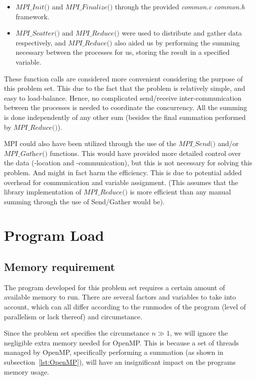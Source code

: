 \documentclass[fontsize=11pt,paper=a4,titlepage]{report}
\begin{document}
\begin{itemize}
	\item{$\textit{MPI\_Init()}$ and $\textit{
MPI\_Finalize()}$ through the provided \textit{common.c} \textit{common.h}
framework.}
	\item{$\textit{MPI\_Scatter()}$ and $\textit{MPI\_Reduce()}$ were used to
distribute 	and gather data respectively, and $\textit{MPI\_Reduce()}$ also
aided us by performing the summing necessary between the processes for us,
storing the result in a specified variable.}
\end{itemize}

These function calls are considered more convenient considering the purpose of
this problem set. This due to the fact that the problem is relatively simple,
and easy to load-balance. Hence, no complicated send/receive inter-communication
between the processes is needed to coordinate the concurrency. All the summing
is done independently of any other sum (besides the final summation performed by
$\textit{MPI\_Reduce()}$).

MPI could also have been utilized through the use of the $\textit{MPI\_Send()}$
and/or $\textit{MPI\_Gather()}$ functions. This would have provided more
detailed control over the data (-location and -communication), but this is not
necessary for solving this problem. And might in fact harm the efficiency. This
is due to potential added overhead for communication and variable assignment.
(This assumes that the library implementation of $\textit{MPI\_Reduce()}$ is
more efficient than any manual summing through the use of Send/Gather would be).

\section{Program Load}

\subsection{Memory requirement}
\label{subsec:MemReq}

The program developed for this problem set requires a certain amount of
available memory to run. There are several factors and variables to take into
account, which can all differ according to the runmodes of the program (level of
parallelism or lack thereof) and circumstance.

Since the problem set specifies the circumstance $n \gg 1$, we will ignore the
negligible extra memory needed for OpenMP. This is because a set of threads
managed by OpenMP, specifically performing a summation (as shown in
subsection~\ref{lst:OpenMP}), will have an insignificant impact on the programs
memory usage.
\end{document}
